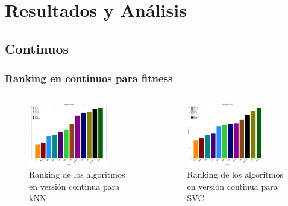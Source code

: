 \section{Resultados y Análisis}

\subsection{Continuos}

\begin{frame}
    \frametitle{Ranking en continuos para fitness}
    \begin{columns}
        \begin{figure}
            \begin{center}
                \includegraphics[width=0.8\textwidth]{imagenes/chapter5/rankings_knn_avg_real.png}
            \end{center}
            \caption{Ranking de los algoritmos en versión continua para kNN}
        \end{figure}
        \begin{figure}
            \begin{center}
                \includegraphics[width=0.8\textwidth]{imagenes/chapter5/rankings_svc_avg_real.png}
            \end{center}
            \caption{Ranking de los algoritmos en versión continua para SVC}
        \end{figure}
    \end{columns}
\end{frame}

